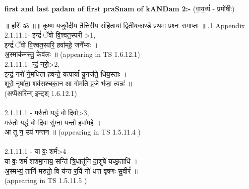 \documentclass[17pt]{extarticle}
\begin{document}
\textbf{first and last padam of first praSnam of kANDam 2:-} \newline
(वा॒य॒व्यं॑ - प्रमो॑षीः) \newline 


॥ हरिः॑ ॐ ॥॥ कृष्ण यजुर्वेदीय तैत्तिरीय संहितायां द्वितीयकाण्डे प्रथमः प्रश्नः समाप्तः ॥ \newline
{}.1   Appendix\\2.1.11.1- इन्द्रं॑ ॅवो वि॒श्वत॒स्परी >1, \\इन्द्रं॑ ॅवो वि॒श्वत॒स्परि॒ हवा॑महे॒ जने᳚भ्यः । \\अ॒स्माक॑मस्तु॒ केव॑लः ॥ (appearing in TS 1.6.12.1)\\2.1.11.1- न्द्रं॒ नरो॒>2, \\इन्द्रं॒ नरो॑ ने॒मधि॑ता हवन्ते॒ यत्पार्या॑ यु॒नज॑ते॒ धिय॒स्ताः ।\\शूरो॒ नृषा॑ता॒ शव॑सश्चका॒न आ गोम॑ति व्र॒जे भ॑जा॒ त्वन्नः॑ ॥\\(अप्पॆअरिन्ग् इन्ट्श् 1.6.12.1)\\\\2.1.11.1 - मरु॑तो॒ यद्ध॑ वो दि॒वो>3, \\मरु॑तो॒ यद्ध॑ वो दि॒वः सु॑म्ना॒ यन्तो॒ हवा॑महे । \\आ तू न॒ उप॑ गन्तन ॥ (appearing in TS 1.5.11.4 )\\\\2.1.11.1 - या वः॒ शर्म॑>4\\या वः॒ शर्म॑ शशमा॒नाय॒ सन्ति॑ त्रि॒धातू॑नि दा॒शुषे॑ यच्छ॒ताधि॑ । \\अ॒स्मभ्यं॒ तानि॑ मरुतो॒ वि य॑न्त र॒यिं नो॑ धत्त वृषणः सु॒वीरं᳚ ॥\\(appearing in TS 1.5.11.5 ) \\
\pagebreak
        
\end{document}
